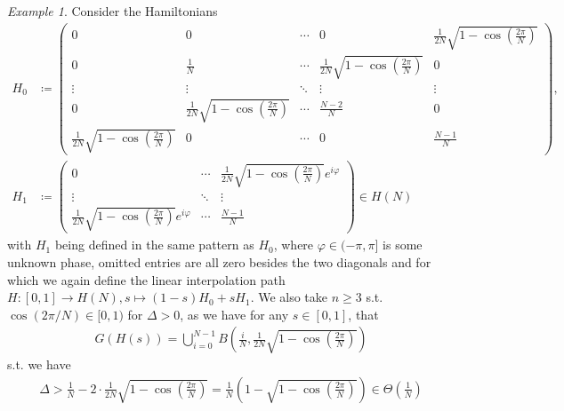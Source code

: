 \documentclass[10pt]{amsart}
\theoremstyle{definition}
\theoremstyle{remark}
\newtheorem{example}[theorem]{Example}
\begin{document}
    \begin{example} \label{circles_example}
        Consider the Hamiltonians
        \begin{align}
            H_0 &\coloneqq \begin{pmatrix}
                                                                      0 &           0 & \cdots & 0 & \frac{1}{2N}\sqrt{1-\cos\left(\frac{2\pi}{N}\right)}\\
                                                                      0 & \frac{1}{N} & \cdots & \frac{1}{2N}\sqrt{1-\cos\left(\frac{2\pi}{N}\right)} & 0\\
                                                                 \vdots &      \vdots & \ddots & \vdots & \vdots\\
                                                                      0 &  \frac{1}{2N}\sqrt{1-\cos\left(\frac{2\pi}{N}\right)} & \cdots & \frac{N-2}{N} & 0\\
                    \frac{1}{2N}\sqrt{1-\cos\left(\frac{2\pi}{N}\right)} &           0 & \cdots & 0 & \frac{N-1}{N}
            \end{pmatrix},\\
            H_1 &\coloneqq \begin{pmatrix}
                0 & \cdots & \frac{1}{2N}\sqrt{1-\cos\left(\frac{2\pi}{N}\right)}e^{i\varphi}\\
                \vdots & \ddots & \vdots\\
                \frac{1}{2N}\sqrt{1-\cos\left(\frac{2\pi}{N}\right)}e^{i\varphi} & \cdots & \frac{N-1}{N}
            \end{pmatrix} \in H(N)
        \end{align}
        with \(H_1\) being defined in the same pattern as \(H_0\), where \(\varphi \in (-\pi, \pi]\) is some unknown phase, omitted entries are all zero besides the two diagonals and for which we again define the linear interpolation path \(H\colon [0, 1] \to H(N), s \mapsto (1-s)H_0+sH_1\). We also take \(n \geq 3\) s.t. \(\cos(2\pi/N) \in [0, 1)\) for \(\Delta > 0\), as we have for any \(s \in [0, 1]\), that
        \begin{align}
            G(H(s)) = \bigcup_{i=0}^{N-1} B\left(\frac{i}{N}, \frac{1}{2N}\sqrt{1-\cos\left(\frac{2\pi}{N}\right)}\right)
        \end{align}
        s.t. we have
        \begin{align}
            \Delta > \frac{1}{N} - 2 \cdot \frac{1}{2N}\sqrt{1-\cos\left(\frac{2\pi}{N}\right)} = \frac{1}{N}\left(1-\sqrt{1-\cos\left(\frac{2\pi}{N}\right)}\right) \in \Theta\left(\frac{1}{N}\right)

\end{align}
\end{example}
\end{document}
